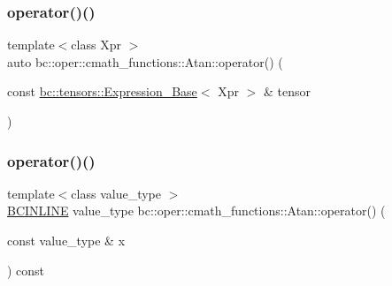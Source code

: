 \mbox{\label{structbc_1_1oper_1_1cmath__functions_1_1Atan_a8df17012bbd853264f0220706adb637a}} 
\subsubsection{\texorpdfstring{operator()()}{operator()()}\hspace{0.1cm}{\footnotesize\ttfamily [2/3]}}
{\footnotesize\ttfamily template$<$class Xpr $>$ \\
auto bc\+::oper\+::cmath\+\_\+functions\+::\+Atan\+::operator() (\begin{DoxyParamCaption}\item[{const \hyperlink{classbc_1_1tensors_1_1Expression__Base}{bc\+::tensors\+::\+Expression\+\_\+\+Base}$<$ Xpr $>$ \&}]{tensor }\end{DoxyParamCaption})\hspace{0.3cm}{\ttfamily [inline]}}

\mbox{\label{structbc_1_1oper_1_1cmath__functions_1_1Atan_a1282c1530ebf9628cd6c95a158787c2c}} 
\subsubsection{\texorpdfstring{operator()()}{operator()()}\hspace{0.1cm}{\footnotesize\ttfamily [3/3]}}
{\footnotesize\ttfamily template$<$class value\+\_\+type $>$ \\
\hyperlink{common_8h_a6699e8b0449da5c0fafb878e59c1d4b1}{B\+C\+I\+N\+L\+I\+NE} value\+\_\+type bc\+::oper\+::cmath\+\_\+functions\+::\+Atan\+::operator() (\begin{DoxyParamCaption}\item[{const value\+\_\+type \&}]{x }\end{DoxyParamCaption}) const\hspace{0.3cm}{\ttfamily [inline]}}




